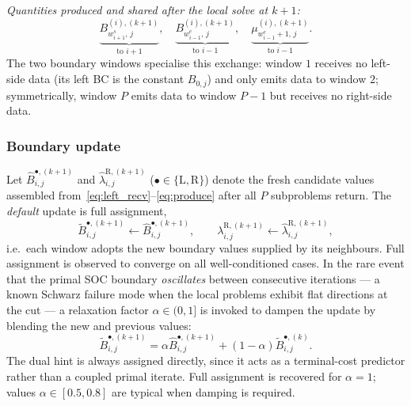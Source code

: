 \emph{Quantities produced and shared after the local solve at $k\!+\!1$:}
\begin{equation}
\label{eq:produce}
\underbrace{B^{(i),(k+1)}_{w^{s}_{i+1},\,j}}_{\text{to }i+1},
\quad
\underbrace{B^{(i),(k+1)}_{w^{e}_{i-1},\,j}}_{\text{to }i-1},
\quad
\underbrace{\mu^{(i),(k+1)}_{w^{e}_{i-1}+1,\,j}}_{\text{to }i-1}.
\end{equation}
The two boundary windows specialise this exchange: window $1$ receives no
left-side data (its left BC is the constant $B_{0,j}$) and only emits
data to window $2$; symmetrically, window $P$ emits data to window
$P\!-\!1$ but receives no right-side data.

\subsubsection*{Boundary update}
Let $\widehat{B}^{\bullet,(k+1)}_{i,j}$ and
$\widehat{\lambda}^{\mathrm{R},(k+1)}_{i,j}$ ($\bullet\!\in\!\{\mathrm{L},\mathrm{R}\}$)
denote the fresh candidate values assembled
from~\eqref{eq:left_recv}--\eqref{eq:produce} after all $P$ subproblems
return. The \emph{default} update is full assignment,
\begin{equation}
\label{eq:full_update}
\widetilde{B}^{\bullet,(k+1)}_{i,j} \leftarrow
\widehat{B}^{\bullet,(k+1)}_{i,j},
\qquad
\lambda^{\mathrm{R},(k+1)}_{i,j} \leftarrow
\widehat{\lambda}^{\mathrm{R},(k+1)}_{i,j},
\end{equation}
i.e.\ each window adopts the new boundary values supplied by its
neighbours. Full assignment is observed to converge on all
well-conditioned cases. In the rare event that the primal SOC boundary
\emph{oscillates} between consecutive iterations — a known Schwarz
failure mode when the local problems exhibit flat directions at the
cut — a relaxation factor $\alpha\!\in\!(0,1]$ is invoked to dampen the
update by blending the new and previous values:
\begin{equation}
\label{eq:relax}
\widetilde{B}^{\bullet,(k+1)}_{i,j} =
\alpha\widehat{B}^{\bullet,(k+1)}_{i,j}
+ (1\!-\!\alpha)\widetilde{B}^{\bullet,(k)}_{i,j}.
\end{equation}
The dual hint is always assigned directly, since it acts as a
terminal-cost predictor rather than a coupled primal iterate. Full
assignment is recovered for $\alpha\!=\!1$; values $\alpha\!\in\![0.5,0.8]$
are typical when damping is required.

